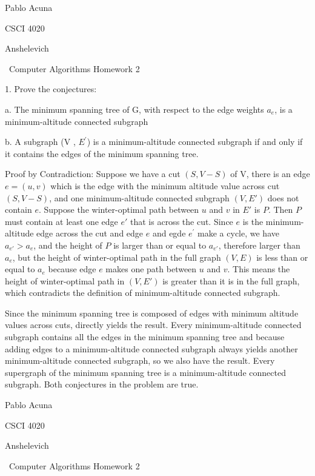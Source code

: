 \documentclass{article}
\begin{document}
Pablo Acuna


CSCI 4020


Anshelevich


{\centering\ Computer Algorithms Homework 2 \par}

1. Prove the conjectures:

\indent \indent a. The minimum spanning tree of G, with respect to the
edge weights $a_{e}$, is a minimum-altitude connected subgraph

\indent \indent b. A subgraph (V , $E^{'}$) is a minimum-altitude
connected subgraph if and only if it contains the edges of the
minimum spanning tree. \newline



Proof by Contradiction:
Suppose we have a cut $(S, V-S)$ of V, there is an edge $e=(u,v)$ which is
the edge with the minimum altitude value across cut $(S, V-S)$, and
one minimum-altitude connected subgraph $(V,E')$ does not contain
$e$. Suppose the winter-optimal path between $u$ and $v$ in
$E'$ is $P$.  Then $P$ must contain at least one edge $e'$ that is
across the cut. Since $e$ is the minimum-altitude edge across the cut
and edge $e$ and egde $e^{'}$ make a cycle, we have $a_{e'}>a_e$,
and the height of $P$ is larger than or equal to $a_{e'}$,
therefore larger than $a_e$, but the height of winter-optimal path
in the full graph $(V,E)$ is less than or equal to $a_e$ because
edge $e$ makes one path between $u$ and $v$.  This means the height of
winter-optimal path in $(V,E')$ is greater than it is in the full
graph, which contradicts the definition of minimum-altitude
connected subgraph.

Since the minimum spanning tree is composed of edges
with minimum altitude values across cuts, directly yields the result.
Every minimum-altitude connected subgraph contains all the edges
in the minimum spanning tree and because adding edges to a
minimum-altitude connected subgraph always yields another
minimum-altitude connected subgraph, so we also have the result.
Every supergraph of the minimum spanning tree is a minimum-altitude
connected subgraph. Both conjectures in the problem are true.

\clearpage
Pablo Acuna


CSCI 4020


Anshelevich


{\centering\ Computer Algorithms Homework 2 \par}
\end{document}
